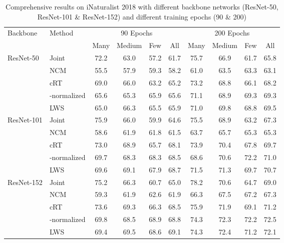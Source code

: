 \documentclass[dvipsnames]{article} \usepackage{iclr2020_conference, times}
\newcommand{\joint}{Joint\xspace}
\newcommand{\ncm}{NCM\xspace}
\newcommand{\retrain}{cRT\xspace}
\newcommand{\wnorm}{-normalized\xspace}
\newcommand{\LWS}{LWS}
\newcommand{\wscale}{\LWS}
\begin{document}
\begin{table}[h]
\small
\caption{Comprehensive results on iNaturalist 2018 with different backbone networks (ResNet-50, ResNet-101 \& ResNet-152) and different training epochs (90 \& 200)}
\label{tab:inat_extra}
\begin{center}
\begin{tabular}{ll|cccc|cccc}
\toprule
\multirow{2}{*}{Backbone} & \multirow{2}{*}{Method} & \multicolumn{4}{c}{90 Epochs} & \multicolumn{4}{|c}{200 Epochs} \\
 &  & Many & Medium & Few & All & Many & Medium & Few & All\\
\midrule
\multirow{4}{*}{ResNet-50}
&\joint & 72.2 & 63.0 & 57.2 & 61.7 & 75.7 & 66.9 & 61.7 & 65.8 \\
& \ncm & 55.5 & 57.9 & 59.3 & 58.2 & 61.0 & 63.5 & 63.3 & 63.1\\
& \retrain & 69.0 & 66.0 & 63.2 & 65.2 & 73.2 & 68.8 & 66.1 & 68.2\\
& \wnorm & 65.6 & 65.3 & 65.9 & 65.6 & 71.1 & 68.9 & 69.3 & 69.3\\
& \wscale & 65.0 & 66.3 & 65.5 & 65.9 & 71.0 & 69.8 & 68.8 & 69.5 \\
\midrule
\multirow{4}{*}{ResNet-101}
& \joint & 75.9 & 66.0 & 59.9 & 64.6 & 75.5 & 68.9 & 63.2 & 67.3 \\
& \ncm & 58.6 & 61.9 & 61.8 & 61.5 & 63.7 & 65.7 & 65.3 & 65.3\\
& \retrain & 73.0 & 68.9 & 65.7 & 68.1 & 73.9 & 70.4 & 67.8 & 69.7 \\
& \wnorm & 69.7 & 68.3 & 68.3 & 68.5 & 68.6 & 70.6 & 72.2 & 71.0  \\
& \wscale & 69.6 & 69.1 & 67.9 & 68.7 & 71.5 & 71.3 & 69.7 & 70.7 \\
\midrule
\multirow{4}{*}{ResNet-152}
& \joint & 75.2 & 66.3 & 60.7 & 65.0 & 78.2 & 70.6 & 64.7 & 69.0\\
& \ncm & 59.3 & 61.9 & 62.6 & 61.9 & 66.3 & 67.5 & 67.2 & 67.3 \\
& \retrain & 73.6 & 69.3 & 66.3 & 68.5 & 75.9 & 71.9 & 69.1 & 71.2\\
& \wnorm & 69.8 & 68.5 & 68.9 & 68.8 & 74.3 & 72.3 & 72.2 & 72.5 \\
& \wscale & 69.4 & 69.5 & 68.6 & 69.1 & 74.3 & 72.4 & 71.2 & 72.1 \\
\bottomrule
\end{tabular}
\end{center}

\end{table}
\end{document}
